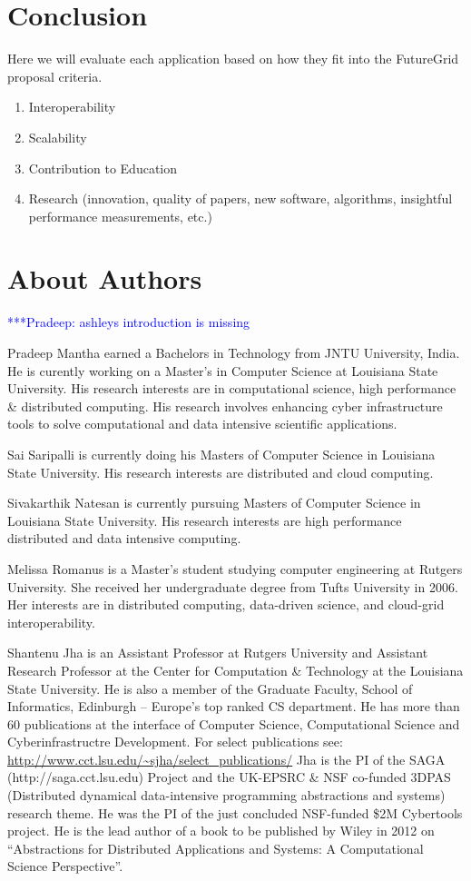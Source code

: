 \documentclass[]{paper}
\newcommand{\pmnote}[1]{ {\textcolor{blue} { ***Pradeep: #1 }}}
\newcommand{\pmnote}[1]{}
\begin{document}
\section{Conclusion}
Here we will evaluate each application based on how they fit into the
FutureGrid proposal criteria.
\begin{enumerate}
\item Interoperability
\item Scalability
\item Contribution to Education
\item Research (innovation, quality of papers, new software, algorithms, insightful performance measurements, etc.)
\end{enumerate}


\section{About Authors} 

\pmnote{ashleys introduction is missing}

Pradeep Mantha earned a Bachelors in Technology from JNTU University, India. He is curently working on a Master's in Computer Science at
Louisiana State University. His research interests are in computational science, high performance \& distributed computing. His research involves enhancing
cyber infrastructure tools to solve computational and data intensive scientific applications.

Sai Saripalli is currently doing his Masters of Computer Science in Louisiana State University. His research interests are distributed and cloud computing. 

Sivakarthik Natesan is currently pursuing Masters of Computer Science in Louisiana State University. His research interests are high performance distributed and data intensive computing.

Melissa Romanus is a Master's student studying computer engineering at Rutgers University. She received her undergraduate degree from Tufts
University in 2006. Her interests are in distributed computing, data-driven science, and cloud-grid interoperability.



Shantenu Jha is an Assistant Professor at Rutgers University and Assistant
Research Professor at the Center for Computation \& Technology at the
Louisiana State University. He is also a member of the Graduate Faculty,
School of Informatics, Edinburgh -- Europe's top ranked CS department. He has
more than 60 publications at the interface of Computer Science, Computational
Science and Cyberinfrastructre Development. For select publications see:
\url{http://www.cct.lsu.edu/~sjha/select_publications/} Jha is the PI of the
SAGA (http://saga.cct.lsu.edu) Project and the UK-EPSRC \& NSF co-funded 3DPAS
(Distributed dynamical data-intensive programming abstractions and systems)
research theme. He was the PI of the just concluded NSF-funded \$2M Cybertools
project. He is the lead author of a book to be published by Wiley in 2012 on
``Abstractions for Distributed Applications and Systems: A Computational
Science Perspective''.




\end{document}
